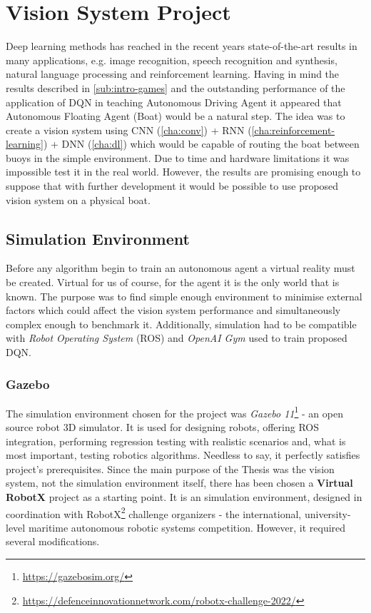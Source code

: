 \chapter{Vision System Project}
\label{cha:vision-system-project}

Deep learning methods has reached in the recent years state-of-the-art results in many applications, e.g. image recognition, speech recognition and synthesis, natural language processing and reinforcement learning. Having in mind the results described in \ref{sub:intro-games} and the outstanding performance of the application of DQN in teaching Autonomous Driving Agent \cite{2020DuckieTown} it appeared that Autonomous Floating Agent (Boat) would be a natural step. The idea was to create a vision system using CNN (\ref{cha:conv}) + RNN (\ref{cha:reinforcement-learning}) + DNN (\ref{cha:dl}) which would be capable of routing the boat between buoys in the simple environment. Due to time and hardware limitations it was impossible test it in the real world. However, the results are promising enough to suppose that with further development it would be possible to use proposed vision system on a physical boat.

\section{Simulation Environment}
\label{sec:simulation-env}

Before any algorithm begin to train an autonomous agent a virtual reality must be created. Virtual for us of course, for the agent it is the only world that is known. The purpose was to find simple enough environment to minimise external factors which could affect the vision system performance and simultaneously complex enough to benchmark it. Additionally, simulation had to be compatible with \emph{Robot Operating System} (ROS) and \emph{OpenAI Gym} used to train proposed DQN. 

\subsection{Gazebo}
\label{sub:gazebo}

The simulation environment chosen for the project was \emph{Gazebo 11}\footnote{\url{https://gazebosim.org/}} - an open source robot 3D simulator.
It is used for designing robots, offering ROS integration, performing regression testing with realistic scenarios and, what is most important, testing robotics algorithms. Needless to say, it perfectly satisfies project's prerequisites. Since the main purpose of the Thesis was the vision system, not the simulation environment itself, there has been chosen a \textbf{Virtual RobotX} \cite{bingham19toward} project as a starting point. It is an simulation environment, designed in coordination with RobotX\footnote{\url{https://defenceinnovationnetwork.com/robotx-challenge-2022/}} challenge organizers - the international, university-level maritime autonomous robotic systems competition. However, it required several modifications.

